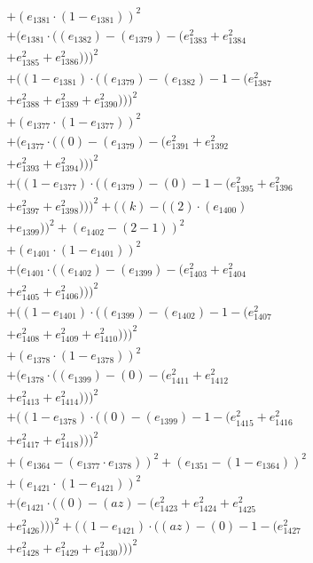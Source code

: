 \documentclass[10pt, a4paper]{article}
\begin{document}
\begin{align*}
& + (e_{1381}  \cdot  (1 - e_{1381}))^{2} \\
& + (e_{1381}  \cdot  ((e_{1382}) - (e_{1379}) - (e_{1383}^{2} + e_{1384}^{2} \\
& + e_{1385}^{2} + e_{1386}^{2})))^{2} \\
& + ((1 - e_{1381})  \cdot  ((e_{1379}) - (e_{1382}) - 1 - (e_{1387}^{2} \\
& + e_{1388}^{2} + e_{1389}^{2} + e_{1390}^{2})))^{2} \\
& + (e_{1377}  \cdot  (1 - e_{1377}))^{2} \\
& + (e_{1377}  \cdot  ((0) - (e_{1379}) - (e_{1391}^{2} + e_{1392}^{2} \\
& + e_{1393}^{2} + e_{1394}^{2})))^{2} \\
& + ((1 - e_{1377})  \cdot  ((e_{1379}) - (0) - 1 - (e_{1395}^{2} + e_{1396}^{2} \\
& + e_{1397}^{2} + e_{1398}^{2})))^{2} + ((k) - ((2)  \cdot  (e_{1400}) \\
& + e_{1399}))^{2} + (e_{1402} - (2 - 1))^{2} \\
& + (e_{1401}  \cdot  (1 - e_{1401}))^{2} \\
& + (e_{1401}  \cdot  ((e_{1402}) - (e_{1399}) - (e_{1403}^{2} + e_{1404}^{2} \\
& + e_{1405}^{2} + e_{1406}^{2})))^{2} \\
& + ((1 - e_{1401})  \cdot  ((e_{1399}) - (e_{1402}) - 1 - (e_{1407}^{2} \\
& + e_{1408}^{2} + e_{1409}^{2} + e_{1410}^{2})))^{2} \\
& + (e_{1378}  \cdot  (1 - e_{1378}))^{2} \\
& + (e_{1378}  \cdot  ((e_{1399}) - (0) - (e_{1411}^{2} + e_{1412}^{2} \\
& + e_{1413}^{2} + e_{1414}^{2})))^{2} \\
& + ((1 - e_{1378})  \cdot  ((0) - (e_{1399}) - 1 - (e_{1415}^{2} + e_{1416}^{2} \\
& + e_{1417}^{2} + e_{1418}^{2})))^{2} \\
& + (e_{1364} - (e_{1377}  \cdot  e_{1378}))^{2} + (e_{1351} - (1 - e_{1364}))^{2} \\
& + (e_{1421}  \cdot  (1 - e_{1421}))^{2} \\
& + (e_{1421}  \cdot  ((0) - (az) - (e_{1423}^{2} + e_{1424}^{2} + e_{1425}^{2} \\
& + e_{1426}^{2})))^{2} + ((1 - e_{1421})  \cdot  ((az) - (0) - 1 - (e_{1427}^{2} \\
& + e_{1428}^{2} + e_{1429}^{2} + e_{1430}^{2})))^{2} \\

\end{align*}
\end{document}
